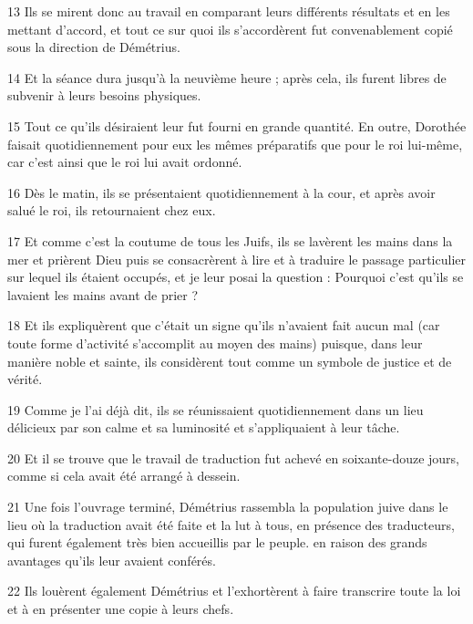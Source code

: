 \par 13 Ils se mirent donc au travail en comparant leurs différents résultats et en les mettant d'accord, et tout ce sur quoi ils s'accordèrent fut convenablement copié sous la direction de Démétrius.

\par 14 Et la séance dura jusqu'à la neuvième heure ; après cela, ils furent libres de subvenir à leurs besoins physiques.

\par 15 Tout ce qu'ils désiraient leur fut fourni en grande quantité. En outre, Dorothée faisait quotidiennement pour eux les mêmes préparatifs que pour le roi lui-même, car c'est ainsi que le roi lui avait ordonné.

\par 16 Dès le matin, ils se présentaient quotidiennement à la cour, et après avoir salué le roi, ils retournaient chez eux.

\par 17 Et comme c'est la coutume de tous les Juifs, ils se lavèrent les mains dans la mer et prièrent Dieu puis se consacrèrent à lire et à traduire le passage particulier sur lequel ils étaient occupés, et je leur posai la question : Pourquoi c'est qu'ils se lavaient les mains avant de prier ?

\par 18 Et ils expliquèrent que c'était un signe qu'ils n'avaient fait aucun mal (car toute forme d'activité s'accomplit au moyen des mains) puisque, dans leur manière noble et sainte, ils considèrent tout comme un symbole de justice et de vérité.

\par 19 Comme je l'ai déjà dit, ils se réunissaient quotidiennement dans un lieu délicieux par son calme et sa luminosité et s'appliquaient à leur tâche.

\par 20 Et il se trouve que le travail de traduction fut achevé en soixante-douze jours, comme si cela avait été arrangé à dessein.

\par 21 Une fois l'ouvrage terminé, Démétrius rassembla la population juive dans le lieu où la traduction avait été faite et la lut à tous, en présence des traducteurs, qui furent également très bien accueillis par le peuple. en raison des grands avantages qu'ils leur avaient conférés.

\par 22 Ils louèrent également Démétrius et l'exhortèrent à faire transcrire toute la loi et à en présenter une copie à leurs chefs.

